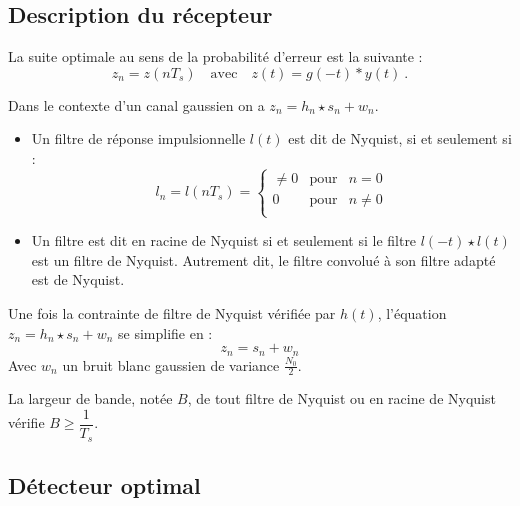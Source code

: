 \subsection{Description du récepteur}

	\begin{pop}
		La suite optimale au sens de la probabilité d'erreur est la suivante :
		$$z_{n} = z(nT_{s}) \quad \text{avec} \quad z(t)=g(-t)*y(t)\ .$$
	\end{pop}
	
	\begin{pop}
	Dans le contexte d'un canal gaussien on a $z_{n} = h_{n} \star s_{n} + w_{n}$.
	\end{pop}
	
	\begin{defn}
	
		\begin{itemize}
		
		\item Un filtre de réponse impulsionnelle $l(t)$ est dit de Nyquist, si et seulement si :
		$$l_{n} = l(nT_{s}) =
		\left\{ \begin{array}{rcr}
			\neq 0 & \text{pour} & n = 0 \\
			0      & \text{pour} & n \neq 0 \\
		\end{array} \right.$$
		\item Un filtre est dit en racine de Nyquist si et seulement si le filtre $l(-t)\star l(t)$ est un filtre de Nyquist. Autrement dit, le filtre convolué à son filtre adapté est de Nyquist.
		\end{itemize}
	\end{defn}
	
	\begin{pop}
		Une fois la contrainte de filtre de Nyquist vérifiée par $h(t)$, l'équation $z_{n} = h_{n} \star s_{n} + w_{n}$ se simplifie en :
		$$z_{n} = s_{n} + w_{n}$$
		Avec $w_n$ un bruit blanc gaussien de variance $\frac{N_0}{2}$.
	\end{pop}
	
	\begin{pop}
		La largeur de bande, notée $B$, de tout filtre de Nyquist ou en racine de Nyquist vérifie $B\geq \dfrac{1}{T_{s}}$.
	\end{pop}
	
\subsection{Détecteur optimal}

